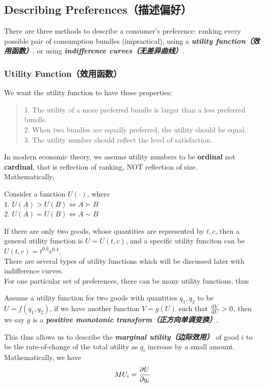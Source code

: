 \subsection{Describing Preferences（描述偏好）}
There are three methods to describe a consumer's preference: ranking every possible pair of consumption bundles (impractical), using a \textbf{\textit{utility function（效用函数）}}, or using \textbf{\textit{indifference curves（无差异曲线）}}.
\subsubsection{Utility Function（效用函数）}
We want the utility function to have these properties:
\begin{quote}
    1. The utility of a more preferred bundle is larger than a less preferred bundle. \\
    2. When two bundles are equally preferred, the utility should be equal. \\
    3. The utility number should reflect the level of satisfaction.
\end{quote}
In modern economic theory, we assume utility numbers to be \textbf{ordinal} not \textbf{cardinal}, that is reflection of ranking, NOT reflection of size. \\
Mathematically,
\begin{definition}
    Consider a function $U(\cdot)$, where \\
    1. $U(A) > U(B) \iff A \succ B$ \\
    2. $U(A) = U(B) \iff A \sim B$
\end{definition}
If there are only two goods, whose quantities are represented by $t, c$, then a general utility function is $U = U(t,c)$, and a specific utility funciton can be $U(t,c) = t^{0.6}c^{0.4}$. \\
There are several types of utility functions which will be discussed later with indifference curves. \\
For one particular set of preferences, there can be many utility functions, thus
\begin{definition}
    Assume a utility function for two goods with quantities $q_1, q_2$ to be $U = f(q_1, q_2)$, if we have another function $V = g(U)$ such that $\dv{V}{U} > 0$, then we say $g$ is a \textbf{\textit{positive monotonic transform（正方向单调变换）}}.
\end{definition}
This thus allows us to describe the \textbf{\textit{marginal utility（边际效用）}} of good $i$ to be the rate-of-change of the total utility as $q_i$ increase by a small amount. Mathematically, we have
$$MU_i = \pdv{U}{q_i}$$

